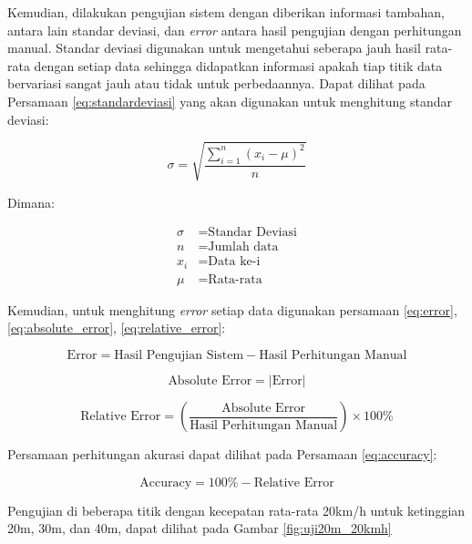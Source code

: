 Kemudian, dilakukan pengujian sistem dengan diberikan informasi tambahan, antara lain standar deviasi, dan \emph{error} antara hasil pengujian dengan perhitungan manual. Standar deviasi digunakan untuk mengetahui seberapa jauh hasil rata-rata dengan setiap data sehingga didapatkan informasi apakah tiap titik data bervariasi sangat jauh atau tidak untuk perbedaannya. Dapat dilihat pada Persamaan \ref{eq:standardeviasi} yang akan digunakan untuk menghitung standar deviasi:

\begin{equation}
\sigma = \sqrt{\frac{\sum_{i=1}^n (x_i - \mu)^2}{n}} \label{eq:standardeviasi}
\end{equation}

Dimana:

\[
\begin{aligned}
\sigma & = \text{Standar Deviasi} \\
n & = \text{Jumlah data} \\
x_i & = \text{Data ke-i} \\
\mu & = \text{Rata-rata}
\end{aligned}
\]

Kemudian, untuk menghitung \emph{error} setiap data digunakan persamaan \ref{eq:error}, \ref{eq:absolute_error}, \ref{eq:relative_error}:

\begin{equation}
\text{Error} = \text{Hasil Pengujian Sistem} - \text{Hasil Perhitungan Manual} \label{eq:error}
\end{equation}

\begin{equation}
\text{Absolute Error} = \left| \text{Error} \right| \label{eq:absolute_error}
\end{equation}

\begin{equation}
\text{Relative Error} = \left( \frac{\text{Absolute Error}}{\text{Hasil Perhitungan Manual}} \right) \times 100\% \label{eq:relative_error}
\end{equation}

Persamaan perhitungan akurasi dapat dilihat pada Persamaan \ref{eq:accuracy}:

\begin{equation}
\text{Accuracy} = 100\% - \text{Relative Error} \label{eq:accuracy}
\end{equation}

Pengujian di beberapa titik dengan kecepatan rata-rata 20km/h untuk ketinggian 20m, 30m, dan 40m, dapat dilihat pada Gambar \ref{fig:uji20m_20kmh} 

